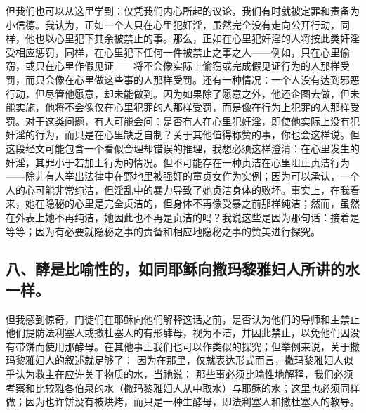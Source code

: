 但我们也可以从这里学到：仅凭我们内心所起的议论，我们有时就被定罪和责备为小信德。我认为，正如一个人只在心里犯奸淫，虽然完全没有走向公开行动，同样，他也以心里犯下其余被禁止的事。那么，正如在心里犯奸淫的人将按此类奸淫受相应惩罚，同样，在心里犯下任何一件被禁止之事之人——例如，只在心里偷窃，或只在心里作假见证——将不会像实际上偷窃或完成假见证行为的人那样受罚，而只会像在心里做这些事的人那样受罚。还有一种情况：一个人没有达到邪恶行动，但尽管他愿意，却未能做到。因为如果除了愿意之外，他还企图去做，但未能实施，他将不会像仅在心里犯罪的人那样受罚，而是像在行为上犯罪的人那样受罚。对于这类问题，有人可能会问：是否有人在心里犯奸淫，即使他实际上没有犯奸淫的行为，而只是在心里缺乏自制？关于其他值得称赞的事，你也会这样说。但这段经文可能包含一个看似合理却错误的推理，我想必须这样澄清：在心里发生的奸淫，其罪小于若加上行为的情况。但不可能存在一种贞洁在心里阻止贞洁行为——除非有人举出法律中在野地里被强奸的童贞女作为实例；因为可以承认，一个人的心可能非常纯洁，但淫乱中的暴力导致了她贞洁身体的败坏。事实上，在我看来，她在隐秘的心里是完全贞洁的，但身体不再像受暴之前那样纯洁；然而，虽然在外表上她不再纯洁，她因此也不再是贞洁的吗？我说这些是因为那句话：接着是 等等；因为有必要就隐秘之事的责备和相应地隐秘之事的赞美进行探究。\par


\subsection{八、酵是比喻性的，如同耶稣向撒玛黎雅妇人所讲的水一样。}

但我感到惊奇，门徒们在耶稣向他们解释这话之前，是否认为他们的导师和主禁止他们提防法利塞人或撒杜塞人的有形酵母，视为不洁，并因此禁止，以免他们因没有带饼而使用那酵母。在其他事上我们也可以作类似的探究；但举例来说，关于撒玛黎雅妇人的叙述就足够了： 因为在那里，仅就表达形式而言，撒玛黎雅妇人似乎认为救主在应许关于物质的水，当祂说： 那些事必须比喻性地解释，我们必须考察和比较雅各伯泉的水（撒玛黎雅妇人从中取水）与耶稣的水；这里也必须同样做；因为也许饼没有被烘烤，而只是一种生酵母，即法利塞人和撒杜塞人的教导。\par


